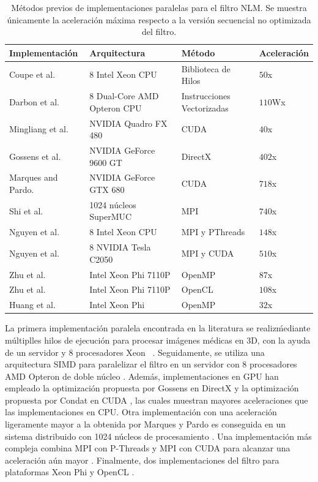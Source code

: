 \begin{table}
\caption[Estado del arte en paralelizaciones del filtro NLM]{M\'etodos previos de implementaciones paralelas para el filtro NLM. Se muestra \'unicamente la aceleraci\'on m\'axima respecto a la versi\'on secuencial no optimizada del filtro.}
\begin{tabularx}{1\linewidth}{X X X X} 
\hline
Implementaci\'on & Arquitectura & M\'etodo & Aceleraci\'on \\ [0.5ex]
 \hline\hline
 Coupe et al. \cite{coupe2006fast} &  8 Intel Xeon CPU & Biblioteca de Hilos & $50$x\\
 Darbon et al. \cite{Darbon2008} &  8 Dual-Core AMD Opteron CPU & Instrucciones Vectorizadas & $110$Wx\\
 Mingliang et al. \cite{mingliang2016medical} &  NVIDIA Quadro FX 480 & CUDA & $40$x\\
Gossens et al. \cite{goossens2010gpu} &  NVIDIA GeForce 9600 GT & DirectX & $402$x\\
Marques and Pardo. \cite{marques2013implementation} &  NVIDIA GeForce GTX 680 & CUDA & $718$x\\ 
Shi et al. \cite{shi2015optimized} &   1024 n\'ucleos SuperMUC & MPI & $740$x\\
Nguyen et al. \cite{nguyen2016medical} &   8 Intel Xeon CPU & MPI y PThreads & $148$x\\
Nguyen et al. \cite{nguyen2016medical} &   8 NVIDIA Tesla C2050 & MPI y CUDA & $510$x\\
Zhu et al. \cite{zhu2016parallel} &  Intel Xeon Phi 7110P & OpenMP & $87$x\\
Zhu et al. \cite{zhu2016parallel} &  Intel Xeon Phi 7110P & OpenCL & $108$x\\
Huang et al. \cite{huang2017parallel} &  Intel Xeon Phi & OpenMP & $32$x\\
\end{tabularx}
\label{method_table}
\end{table}

La primera implementaci\'on paralela encontrada en la literatura se realiz\' mediante m\'ultiplles hilos de ejecuci\'on para procesar im\'agenes m\'edicas en 3D, con la ayuda de un servidor y 8 procesadores Xeon \ \cite{coupe2006fast}. Seguidamente, se utiliza una arquitectura SIMD para paralelizar el filtro en un servidor con 8 procesadores AMD Opteron de doble n\'ucleo \cite{Darbon2008}. Adem\'as, implementaciones en GPU han empleado la optimizaci\'on propuesta por Gossens en DirectX \cite{marques2013implementation} y la optimizaci\'on propuesta por Condat en CUDA \cite{mingliang2016medical,goossens2010gpu}, las cuales muestran mayores aceleraciones que las implementaciones en CPU. Otra implementaci\'on con una aceleraci\'on ligeramente mayor a la obtenida por Marques y Pardo \cite{marques2013implementation} es conseguida en un sistema distribuido con 1024 n\'ucleos de procesamiento \cite{shi2015optimized}. Una implementaci\'on m\'as compleja combina MPI con P-Threads y MPI con CUDA para alcanzar una aceleraci\'on a\'un mayor \cite{nguyen2016medical}. Finalmente, dos implementaciones del filtro para plataformas Xeon Phi \cite{zhu2016parallel,huang2017parallel} y OpenCL \cite{zhu2016parallel}.

